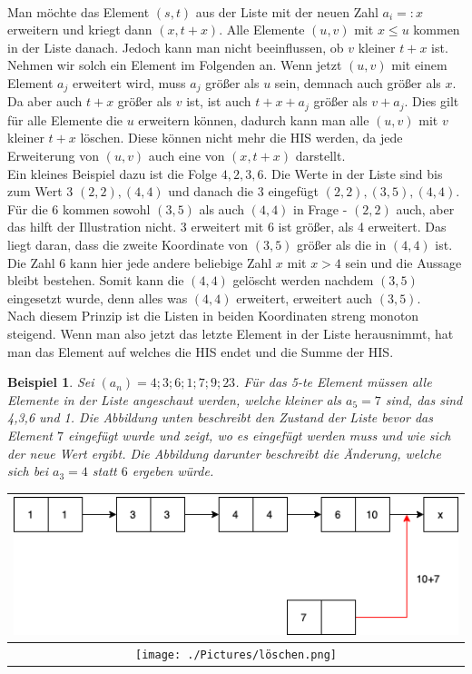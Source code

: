 \newtheorem{beispiel}{Beispiel}
\\
Man möchte das Element $(s,t)$ aus der Liste mit der neuen Zahl $a_i=:x$ erweitern und kriegt dann $(x,t+x)$. Alle Elemente $(u,v)$ mit $x \leq u$ kommen in der Liste danach. Jedoch kann man nicht beeinflussen, ob $v$ kleiner $t+x$ ist. Nehmen wir solch ein Element im Folgenden an. Wenn jetzt $(u,v)$ mit einem Element $a_j$ erweitert wird, muss $a_j$ größer als $u$ sein, demnach auch größer als $x$. Da aber auch $t+x$ größer als $v$ ist, ist auch $t+x+a_j$ größer als $v+a_j$. Dies gilt für alle Elemente die $u$ erweitern können, dadurch kann man alle $(u,v)$ mit $v$ kleiner $t+x$ löschen. Diese können nicht mehr die HIS werden, da jede Erweiterung von $(u,v)$ auch eine von $(x,t+x)$ darstellt.\\
Ein kleines Beispiel dazu ist die Folge $4,2,3,6$. Die Werte in der Liste sind bis zum Wert 3 $(2,2),(4,4)$ und danach die 3 eingefügt $(2,2),(3,5),(4,4)$. Für die 6 kommen sowohl $(3,5)$ als auch $(4,4)$ in Frage - $(2,2)$ auch, aber das hilft der Illustration nicht. 3 erweitert mit 6 ist größer, als 4 erweitert. Das liegt daran, dass die zweite Koordinate von $(3,5)$ größer als die in $(4,4)$ ist. Die Zahl 6 kann hier jede andere beliebige Zahl $x$ mit $x>4$ sein und die Aussage bleibt bestehen. Somit kann die $(4,4)$ gelöscht werden nachdem $(3,5)$ eingesetzt wurde, denn alles was $(4,4)$ erweitert, erweitert auch $(3,5)$.
\\
Nach diesem Prinzip ist die Listen in beiden Koordinaten streng monoton steigend. Wenn man also jetzt das letzte Element in der Liste herausnimmt, hat man das Element auf welches die HIS endet und die Summe der HIS.
\begin{beispiel}
    Sei $(a_n)=4;3;6;1;7;9;23$. Für das 5-te Element müssen alle Elemente in der Liste angeschaut werden, welche kleiner als $a_5=7$ sind, das sind 4,3,6 und 1. Die Abbildung unten beschreibt den Zustand der Liste bevor das Element $7$ eingefügt wurde und zeigt, wo es eingefügt werden muss und wie sich der neue Wert ergibt. Die Abbildung darunter beschreibt die Änderung, welche sich bei $a_3=4$ statt $6$ ergeben würde.
\end{beispiel}
\begin{center}
	\begin{tabular}{c}
		
		\includegraphics[scale=0.7]{./Pictures/pic2.png}\\
		\hline
		\texttt{[image: ./Pictures/löschen.png]}\\
		
	\end{tabular}
\end{center}

